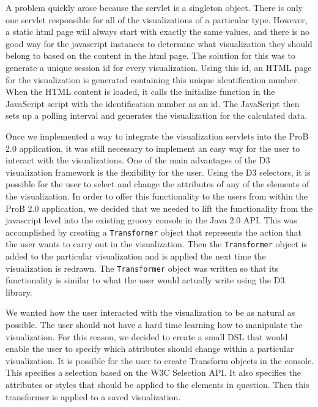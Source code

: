 A problem quickly arose because the servlet is a singleton object. There is only one servlet responsible for all of the visualizations of a particular type. However, a static html page will always start with exactly the same values, and there is no good way for the javascript instances to determine what visualization they should belong to based on the content in the html page. The solution for this was to generate a unique session id for every visualization. Using this id, an HTML page for the visualization is generated containing this unique identification number. When the HTML content is loaded, it calls the initialize function in the JavaScript script with the identification number as an id. The JavaScript then sets up a polling interval and generates the visualization for the calculated data.

Once we implemented a way to integrate the visualization servlets into the ProB 2.0 application, it was still necessary to implement an easy way for the user to interact with the visualizations. One of the main advantages of the D3 visualization framework is the flexibility for the user. Using the D3 selectors, it is possible for the user to select and change the attributes of any of the elements of the visualization. In order to offer this functionality to the users from within the ProB 2.0 application, we decided that we needed to lift the functionality from the javascript level into the existing groovy console in the Java 2.0 API. This was accomplished by creating a \texttt{Transformer} object that represents the action that the user wants to carry out in the visualization. Then the \texttt{Transformer} object is added to the particular visualization and is applied the next time the visualization is redrawn. The \texttt{Transformer} object was written so that its functionality is similar to what the user would actually write using the D3 library.

We wanted how the user interacted with the visualization to be as natural as possible. The user should not have a hard time learning how to manipulate the visualization. For this reason, we decided to create a small DSL that would enable the user to specify which attributes should change within a particular visualization. It is possible for the user to create Transform objects in the console. This specifies a selection based on the W3C Selection API. It also specifies the attributes or styles that should be applied to the elements in question. Then this transformer is applied to a saved visualization.

